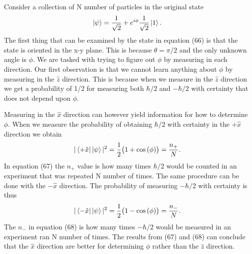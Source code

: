 \documentclass[twocolumn]{article}
\begin{document}
Consider a collection of N number of particles in the original state
\begin{equation}
\ket{\psi}=\frac{1}{\sqrt{2}}+e^{i\phi}\frac{1}{\sqrt{2}}\ket{1}.
\end{equation}
The first thing that can be examined by the state in equation (66) is that the state is oriented in the x-y plane. This is because $\theta=\pi/2$ and the only unknown angle is $\phi$. We are tasked with trying to figure out $\phi$ by measuring in each direction. Our first observation is that we cannot learn anything about $\phi$ by measuring in the $\hat{z}$ direction. This is because when we measure in the $\hat{z}$ direction we get a probability of 1/2 for measuring both $\hbar/2$ and $-\hbar/2$ with certainty that does not depend upon $\phi$.

Measuring in the $\hat{x}$ direction can however yield information for how to determine $\phi$. When we measure the probability of obtaining $\hbar/2$ with certainty in the $+\hat{x}$ direction we obtain
\begin{equation}
|\bra{+\hat{x}}\ket{\psi}|^2=\frac{1}{2}\big(1+\cos{(\phi)}\big)=\frac{n_+}{N}.
\end{equation}
In equation (67) the $n_+$ value is how many times $\hbar/2$ would be counted in an experiment that was repeated N number of times. The same procedure can be done with the $-\hat{x}$ direction. The probability of measuring $-\hbar/2$ with certainty is thus
\begin{equation}
|\bra{-\hat{x}}\ket{\psi}|^2=\frac{1}{2}\big(1-\cos{(\phi)}\big)=\frac{n_-}{N}.
\end{equation}
The $n_-$ in equation (68) is how many times $-\hbar/2$ would be measured in an experiment ran N number of times. The results from (67) and (68) can conclude that the $\hat{x}$ direction are better for determining $\phi$ rather than the $\hat{z}$ direction.
\end{document}
